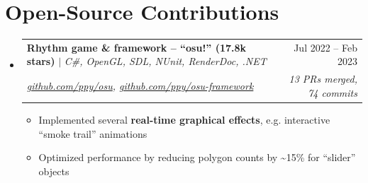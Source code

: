 \documentclass[letterpaper,11pt]{article}
\makeatletter
\newcommand{\resumeItem}[1]{
  \item\small{
    {#1 \vspace{-2pt}}
  }
}
\newcommand{\resumeOSSProjectHeading}[4]{
    \item
    \begin{tabular*}{0.97\textwidth}{l@{\extracolsep{\fill}}r}
      \small#1 & #2 \\
      \textit{\footnotesize #3} & \textit{\footnotesize #4} \\
    \end{tabular*}\vspace{-7pt}
}
\newcommand{\resumeSubHeadingListStart}{\begin{itemize}[leftmargin=0.15in, label={}]}
\newcommand{\resumeSubHeadingListEnd}{\end{itemize}}
\newcommand{\resumeItemListStart}{\begin{itemize}}
\newcommand{\resumeItemListEnd}{\end{itemize}\vspace{-5pt}}
\makeatother
\begin{document}
\section{Open-Source Contributions}
    \resumeSubHeadingListStart
        \resumeOSSProjectHeading
            {\textbf{Rhythm game \& framework -- ``osu!'' (17.8k stars)} $|$ \emph{C\#, OpenGL, SDL, NUnit, RenderDoc, .NET}}{Jul 2022 -- Feb 2023}
            {\href{https://github.com/ppy/osu/pulls?q=is\%3Apr+author\%3Agoodtrailer+is\%3Aclosed}{github.com/ppy/osu}, \href{https://github.com/ppy/osu-framework/pulls?q=is\%3Apr+author\%3Agoodtrailer+is\%3Aclosed}{github.com/ppy/osu-framework}}{13 PRs merged, 74 commits}
            \resumeItemListStart
                \resumeItem{Implemented several \textbf{real-time graphical effects}, e.g. interactive ``smoke trail'' animations}
                \resumeItem{Optimized performance by reducing polygon counts by \textasciitilde15\% for ``slider'' objects}
        \resumeItemListEnd
    \resumeSubHeadingListEnd

\end{document}
